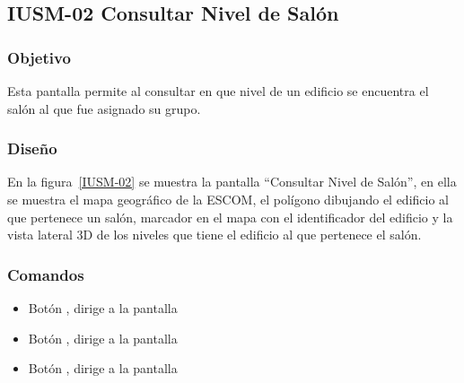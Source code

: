 \subsection{IUSM-02  Consultar Nivel de Salón}

\subsubsection{Objetivo}

	
    Esta pantalla permite al  consultar en que nivel de un edificio se encuentra el salón al que fue asignado su grupo.
\subsubsection{Diseño}


    En la figura~\ref{IUSM-02} se muestra la pantalla ``Consultar Nivel de Salón'', en ella se muestra el mapa geográfico de la ESCOM, el polígono dibujando el edificio al que pertenece un salón, marcador en el mapa con el identificador del edificio y la vista lateral 3D de los niveles que tiene el edificio al que pertenece el salón.
    



\subsubsection{Comandos}
    \begin{itemize}

	\item Botón \botInformacion, dirige a la pantalla 
	\item Botón , dirige a la pantalla 
	\item Botón , dirige a la pantalla  
    \end{itemize}
